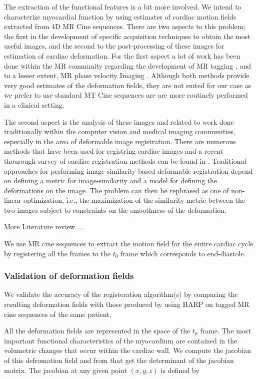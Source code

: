 The extraction of the functional features is a bit more involved. We intend to characterize myocardial function by using estimates of cardiac motion fields extracted from 4D MR Cine sequences. There are two aspects to this problem; the first in the development of specific acquisition techniques to obtain the most useful images, and the second to the post-processing of these images for estimation of cardiac deformation. For the first aspect a lot of work has been done within the MR community regarding the development of MR tagging \cite{mrtag}, and to a lesser extent, MR phase velocity Imaging \cite{mrphase}. Although both methods provide very good estimates of the deformation fields, they are not suited for our case as we prefer to use standard MT Cine sequences are are more routinely performed in a clinical setting. 

The second aspect is the analysis of these images and related to work done traditionally within the computer vision and medical imaging communities, especially in the area of deformable image registration. There are numerous methods that have been used for registring cardiac images and a recent thourough survey of cardiac registration methods can be found in \cite{regSurvey}. Traditional approaches for performing image-similarity based deformable registration depend on defining a metric for image-similarity and a model for defining the deformations on the image. The problem can then be rephrased as one of non-linear optimization, i.e., the maximization of the similarity metric between the two images subject to constraints on the smoothness of the deformation.

More Literature review ...

We use MR cine sequences to extract the motion field for the entire cardiac cycle by registering all the frames to the $t_0$ frame which corresponds to
end-diastole.

\subsubsection{Validation of deformation fields}

We validate the accuracy of the registeration algorithm(s) by comparing the resulting deformation fields with those produced by using HARP \cite{mrtag} on tagged MR cine sequences of the same patient.

All the deformation fields are represented in the space of the $t_0$ frame. The most important functional characteristics of the myocardium are contained in the volumetric changes that occur within the cardiac wall. We compute the jacobian of this defromation field and from that get the determinant of the jacobian matrix. The jacobian at any given point $(x,y,z)$ is defined by

